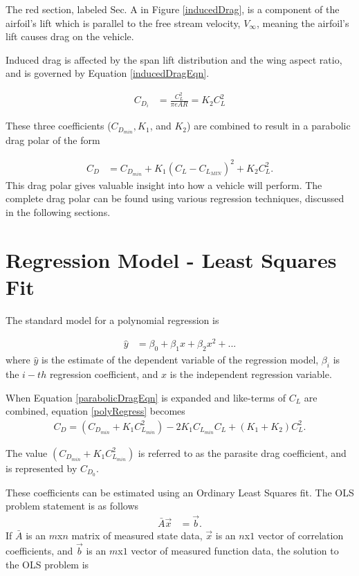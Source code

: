 The red section, labeled Sec. A in Figure \ref{inducedDrag}, is a component of the airfoil's lift which is parallel to the free stream velocity, $V_\infty$, meaning the airfoil's lift causes drag on the vehicle.

Induced drag is affected by the span lift distribution and the wing aspect ratio\cite{prandtl1923applications}, and is governed by Equation \ref{inducedDragEqn}.

\begin{align}
\label{inducedDragEqn}
C_{D_i} &= \frac{C^2_L}{\pi e AR} = K_2 C^2_L
\end{align}

These three coefficients ($C_{D_{min}},K_1$, and $K_2$) are combined to result in a parabolic drag polar of the form 

\begin{align}
\label{parabolicDragEqn}
C_D &= C_{D_{min}} + K_1(C_L-C_{L_{MIN}})^2 + K_2C^2_L.
\end{align}
This drag polar gives valuable insight into how a vehicle will perform. The complete drag polar can be found using various regression techniques, discussed in the following sections.

\section{Regression Model - Least Squares Fit}
The standard model for a polynomial regression is

\begin{align}
\label{polyRegress}
\hat{y} &= \beta_0 + \beta_1x + \beta_2x^2+...
\end{align}
\noindent
where $\hat{y}$ is the estimate of the dependent variable of the regression model, $\beta_i$ is the $i-th$ regression coefficient, and $x$ is the independent regression variable.

When Equation \ref{parabolicDragEqn} is expanded and like-terms of $C_L$ are combined, equation \ref{polyRegress} becomes
\begin{align}
C_D = (C_{D_{min}} + K_1 C^2_{L_{min}}) -2K_1C_{L_{min}}C_L+(K_1+K_2)C^2_L.
\end{align}

The value $(C_{D_{min}}+K_1C^2_{L_{min}})$ is referred to as the parasite drag coefficient, and is represented by $C_{D_0}$\cite{raymer}.

These coefficients can be estimated using an Ordinary Least Squares fit. The OLS problem statement is as follows
\begin{align}
\bar{A}\vec{x} &= \vec{b}.
\end{align}
If $\bar{A}$ is an $m$x$n$ matrix of measured state data, $\vec{x}$ is an $n$x$1$ vector of correlation coefficients, and $\vec{b}$ is an $m$x$1$ vector of measured function data, the solution to the OLS problem is 

